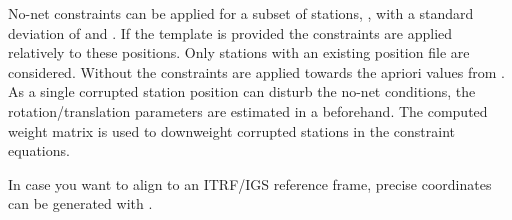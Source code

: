 No-net constraints can be applied for a subset of stations,
, with a
standard deviation of  and .
If the template  is provided
the constraints are applied relatively to these positions. Only stations with an existing position file
are considered. Without 
the constraints are applied towards the apriori values from
.
As a single corrupted station position can disturb the no-net conditions,
the rotation/translation parameters are estimated in a
beforehand. The computed weight matrix is used to downweight corrupted stations
in the constraint equations.

In case you want to align to an ITRF/IGS reference frame, precise coordinates can be
generated with .


